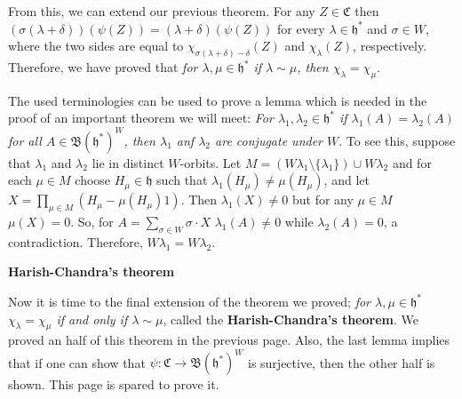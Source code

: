 \documentclass{article}
\newcommand{\lie}[1]{\mathfrak{#1}}
\begin{document}
From this, we can extend our previous theorem.
For any $Z \in \mathfrak{C}$ then $(\sigma(\lambda + \delta))(\psi(Z)) = (\lambda + \delta)(\psi(Z))$ for every $\lambda \in \lie{h}^*$ and $\sigma \in W$, where the two sides are equal to $\chi_{\sigma(\lambda + \delta) - \delta}(Z)$ and $\chi_\lambda(Z)$, respectively.
Therefore, we have proved that \textit{for $\lambda, \mu \in \lie{h}^*$ if $\lambda \sim \mu$, then $\chi_\lambda = \chi_\mu$}.

The used terminologies can be used to prove a lemma which is needed in the proof of an important theorem we will meet: \textit{For $\lambda_1, \lambda_2 \in \lie{h}^*$ if $\lambda_1(A) = \lambda_2(A)$ for all $A \in \mathfrak{B}(\lie{h}^*)^W$, then $\lambda_1$ anf $\lambda_2$ are conjugate under $W$}.
To see this, suppose that $\lambda_1$ and $\lambda_2$ lie in distinct $W$-orbits.
Let $M = (W\lambda_1 \setminus \{\lambda_1\}) \cup W\lambda_2$ and for each $\mu \in M$ choose $H_\mu \in \lie{h}$ such that $\lambda_1(H_\mu) \ne \mu(H_\mu)$, and let $X = \prod_{\mu \in M} (H_\mu - \mu(H_\mu) 1)$.
Then $\lambda_1(X) \ne 0$ but for any $\mu \in M$ $\mu(X) = 0$.
So, for $A = \sum_{\sigma \in W} \sigma \cdot X$ $\lambda_1(A) \ne 0$ while $\lambda_2(A) = 0$, a contradiction.
Therefore, $W\lambda_1 = W\lambda_2$.

\newpage

\textbf{Harish-Chandra's theorem}

Now it is time to the final extension of the theorem we proved; \textit{for $\lambda, \mu \in \lie{h}^*$ $\chi_\lambda = \chi_\mu$ if and only if $\lambda \sim \mu$}, called the \textbf{Harish-Chandra's theorem}.
We proved an half of this theorem in the previous page.
Also, the last lemma implies that if one can show that $\psi : \mathfrak{C} \to \mathfrak{B}(\lie{h}^*)^W$ is surjective, then the other half is shown.
This page is spared to prove it.
\end{document}
